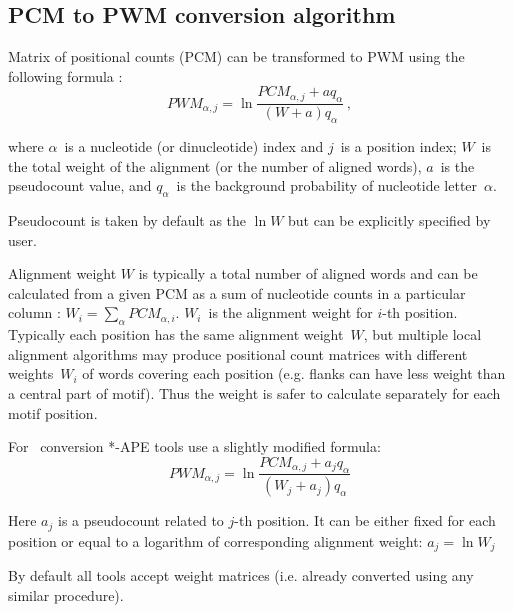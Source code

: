 \subsection{PCM to PWM conversion algorithm}
Matrix of positional counts (PCM) can be transformed to PWM using the following formula \cite{Lifanov2003}:
\begin{equation}PWM_{\alpha,j} = \ln\frac{ PCM_{\alpha,j} + aq_{\alpha} }{ (W+a)q_{\alpha} }\,, \end{equation}

where $\alpha$~is a nucleotide (or dinucleotide) index and $j$~is a position index; $W$~is the total weight of the alignment (or the number of aligned words), $a$~is the
pseudocount value, and $q_{\alpha}$~is the background probability of nucleotide letter~$\alpha$.

Pseudocount is taken by default as the $\ln{W}$ but can be explicitly specified by user.

Alignment weight $W$ is typically a total number of aligned words and can be calculated from
 a given PCM as a sum of nucleotide counts in a particular column : $W_i = \sum_{\alpha}PCM_{\alpha,i}$.
 $W_i$~is the alignment weight for \mbox{$i$-th} position.
 Typically each position has the same alignment weight~$W$, but multiple local alignment algorithms may
 produce positional count matrices with different weights~$W_i$ of words covering each position
 (e.g. flanks can have less weight than a central part of motif). Thus the weight is safer to calculate separately for each motif position.

For \PcmToPwm\ conversion *-APE tools use a slightly modified formula:
\begin{equation}PWM_{\alpha,j} = \ln\frac{ PCM_{\alpha,j} + a_j q_{\alpha} }{ (W_j+a_j)q_{\alpha} }\end{equation}

Here $a_j$ is a pseudocount related to \mbox{$j$-th} position.
It can be either fixed for each position or equal to a logarithm of corresponding alignment weight: $a_j=\ln{W_j}$

By default all tools accept weight matrices (i.e. already converted using any similar procedure).
